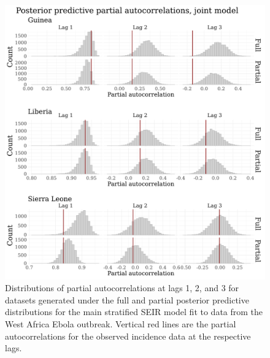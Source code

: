 \begin{figure}[htbp]
	\begin{fullpage}
		\centering
		\includegraphics[width=0.8\linewidth]{figures/ebola_joint_pacfs}
		\caption[Posterior predictive distributions of partial autocorrelations for a stratified SEIR model fit to data from the West Africa Ebola outbreak.]{Distributions of partial autocorrelations at lags 1, 2, and 3 for datasets generated under the full and partial posterior predictive distributions for the main stratified SEIR model fit to data from the West Africa Ebola outbreak. Vertical red lines are the partial autocorrelations for the observed incidence data at the respective lags.}
		\label{fig:ebola_joint_pacfs}
	\end{fullpage}
\end{figure}

